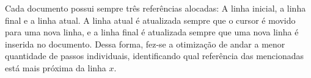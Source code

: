 \documentclass[a4paper, 11pt]{article}
\begin{document}
Cada documento possui sempre três referências alocadas: A linha inicial, a linha final e a linha atual. A linha atual é atualizada sempre que o cursor é movido para uma nova linha, e a linha final é atualizada sempre que uma nova linha é inserida no documento. Dessa forma, fez-se a otimização de andar a menor quantidade de passos individuais, identificando qual referência das mencionadas está mais próxima da linha $x$. 
\end{document}
